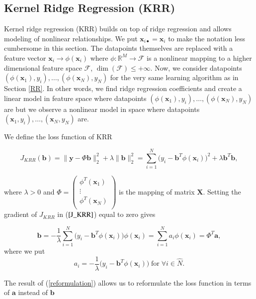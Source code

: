 \documentclass[11pt,american]{book} %
\theoremstyle{plain}
\theoremstyle{definition}
\begin{document}
\subsection{Kernel Ridge Regression (KRR)}
Kernel ridge regression (KRR) builds on top of ridge regression and allows modeling of nonlinear relationships. We put $\bm{x}_{i \bullet} = \bm{x}_i$ to make the notation less cumbersome in this section. The datapoints themselves are replaced with a feature vector $\bm{x}_i \rightarrow \phi(\bm{x}_i) $ where $\phi: \mathbb{R}^{M} \rightarrow \mathcal{F}$ is a nonlinear mapping to a higher dimensional feature space $\mathcal{F}$, $\dim(\mathcal{F}) \leq +\infty$. Now, we consider datapoints $(\phi(\bm{x}_1),y_i), \dots , (\phi(\bm{x}_N), y_N)$ for the very same learning algorithm as in Section \ref{RR}. In other words, we find ridge regression coefficients and create a linear model in feature space where datapoints $(\phi(\bm{x}_1),y_i), \dots , (\phi(\bm{x}_N), y_N)$ are but we observe a nonlinear model in space where datapoints $(\bm{x}_1,y_i), \dots , (\bm{x}_N, y_N)$ are.

We define the loss function of KRR

\begin{equation}
	J_{KRR}(\bm{b}) = \| \bm{y}-\Phi \bm{b} \|^2_2 + \lambda \| \bm{b} \|^2_2 = \sum_{i=1}^{N}\Big( y_i -\bm{b}^T \phi(\bm{x}_i) \Big)^2 + \lambda \bm{b}^T \bm{b},
	\label{J_KRR}
\end{equation}

where $\lambda >0$ and $\Phi = \begin{pmatrix}
	\phi^T (\bm{x}_1) \\
	\vdots \\
	\phi^T (\bm{x}_N) \\
\end{pmatrix}$ is the mapping of matrix $\bm{X}$. Setting the gradient of $J_{KRR}$ in ($\ref{J_KRR}$) equal to zero gives

\begin{equation}
	\bm{b} = -\frac{1}{\lambda} \sum_{i=1}^{N}\Big( y_i -\bm{b}^T \phi(\bm{x}_i) \Big)\phi(\bm{x}_i) = \sum_{i=1}^{N} a_i \phi(\bm{x}_i) = \Phi^T \bm{a},
	\label{reformulation}
\end{equation}
where we put 
\begin{equation}
	a_i = -\frac{1}{\lambda} \Big( y_i -\bm{b}^T \phi(\bm{x}_i) \Big) \; \text{for} \; \forall i \in \hat{N}.
\end{equation}

The result of (\ref{reformulation}) allows us to reformulate the loss function in terms of $\bm{a}$ instead of $\bm{b}$
\end{document}

